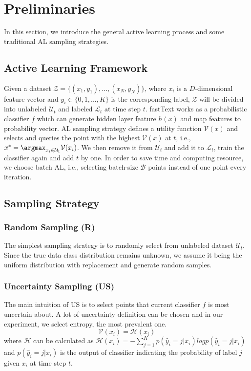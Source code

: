 \section{Preliminaries}
\label{sec:preliminary}
In this section, we introduce the general active learning process and 
some traditional AL sampling strategies. 


\subsection{Active Learning Framework}
Given a dataset $ \mathcal{Z} =  \{(x_1,y_1),...,(x_N,y_N)\}$, where $x_i$ is 
a $D$-dimensional feature vector and $y_i \in \{0,1,...,K\}$ is the corresponding label, 
$\mathcal{Z}$ will be divided into unlabeled $\mathcal{U}_t$ and 
labeled $\mathcal{L}_t$ at time step $t$. 
fastText works as a probabilistic classifier $f$ which can generate hidden layer feature 
$h(x)$ and map features to probability vector. AL sampling strategy defines a utility function $\mathcal{V}(x)$ and selects and queries 
the point with the highest $\mathcal{V}(x)$ at $t$, i.e., $x^*=\argmax_{x_i\in\mathcal{U}_t}\mathcal{V}(x_i)$.
We then remove it from $\mathcal{U}_t$ and 
add it to $\mathcal{L}_t$, train the classifier again and add $t$ by one. In order to save time and computing resource, we choose batch AL, i.e., selecting batch-size $\mathcal{B}$ points 
instead of one point every iteration.

\subsection{Sampling Strategy}
\subsubsection{Random Sampling (R)}
The simplest sampling strategy is to randomly select from unlabeled dataset 
$\mathcal{U}_t$. Since the true data class distribution remains unknown, 
we assume it being the uniform distribution with replacement and generate random samples.

\subsubsection{Uncertainty Sampling (US)}
\label{sec:uncertainty}
The main intuition of US is to select points that current classifier $f$ 
is most uncertain about. A lot of uncertainty definition can be chosen and 
in our experiment, we select entropy, the most prevalent one.
    $$\mathcal{V}(x_i) =  \mathcal{H}(x_i)$$
    where $\mathcal{H}$ can be calculated as $ \mathcal{H}(x_i) = -\sum_{j=1}^K p(\hat{y}_i=j|x_i) log  p(\hat{y}_i=j|x_i)$ and $p(\hat{y}_i=j|x_i)$ is the output of classifier indicating the probability of label $j$ given $x_i$ at time step $t$.
    
